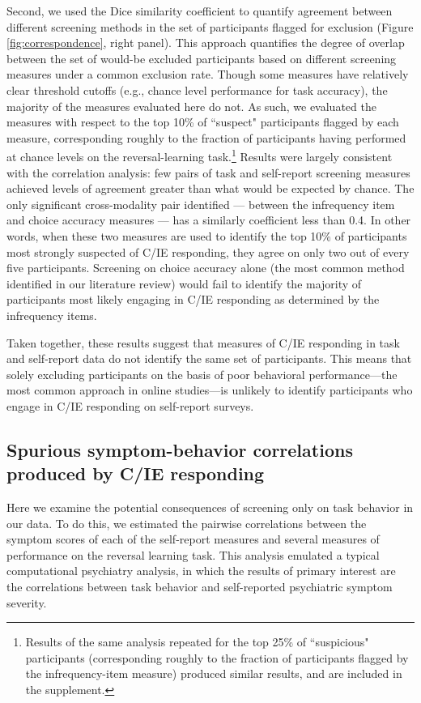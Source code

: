 \documentclass[a4paper,notitlepage,12pt]{article}
\begin{document}
\begin{refsection}[main]
Second, we used the Dice similarity coefficient to quantify agreement between different screening methods in the set of participants flagged for exclusion (Figure \ref{fig:correspondence}, right panel). This approach quantifies the degree of overlap between the set of would-be excluded participants based on different screening measures under a common exclusion rate. Though some measures have relatively clear threshold cutoffs (e.g., chance level performance for task accuracy), the majority of the measures evaluated here do not. As such, we evaluated the measures with respect to the top 10\% of ``suspect" participants flagged by each measure, corresponding roughly to the fraction of participants having performed at chance levels on the reversal-learning task.\footnote{Results of the same analysis repeated for the top 25\% of ``suspicious" participants (corresponding roughly to the fraction of participants flagged by the infrequency-item measure) produced similar results, and are included in the supplement.} Results were largely consistent with the correlation analysis: few pairs of task and self-report screening measures achieved levels of agreement greater than what would be expected by chance. The only significant cross-modality pair identified --- between the infrequency item and choice accuracy measures --- has a similarly coefficient less than 0.4. In other words, when these two measures are used to identify the top 10\% of participants most strongly suspected of C/IE responding, they agree on only two out of every five participants. Screening on choice accuracy alone (the most common method identified in our literature review) would fail to identify the majority of participants most likely engaging in C/IE responding as determined by the infrequency items.

Taken together, these results suggest that measures of C/IE responding in task and self-report data do not identify the same set of participants. This means that solely excluding participants on the basis of poor behavioral performance---the most common approach in online studies---is unlikely to identify participants who engage in C/IE responding on self-report surveys. 

\subsection*{Spurious symptom-behavior correlations produced by C/IE responding}

Here we examine the potential consequences of screening only on task behavior in our data. To do this, we estimated the pairwise correlations between the symptom scores of each of the self-report measures and several measures of performance on the reversal learning task. This analysis emulated a typical computational psychiatry analysis, in which the results of primary interest are the correlations between task behavior and self-reported psychiatric symptom severity.


\end{refsection}
\end{document}
